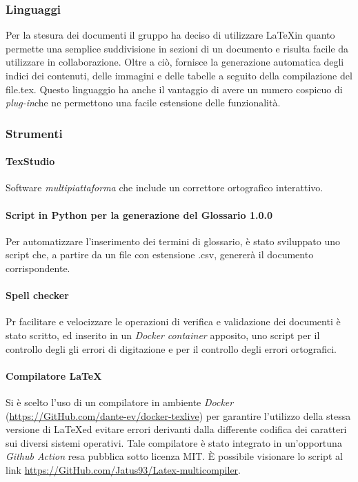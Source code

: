 \subsubsection{Linguaggi}
Per la stesura dei documenti il gruppo ha deciso di utilizzare \LaTeX \space in quanto permette una semplice suddivisione in sezioni di un documento e risulta facile da utilizzare in collaborazione. Oltre a ciò, fornisce la generazione automatica degli indici dei contenuti, delle immagini e delle tabelle a seguito della compilazione del file.tex. Questo linguaggio ha anche il vantaggio di avere un numero cospicuo di \textit{plug-in}\glo che ne permettono una facile estensione delle funzionalità.

\subsubsection{Strumenti}
\paragraph{TexStudio}
Software \textit{multipiattaforma\glo} che include un correttore ortografico interattivo.

\paragraph{Script in Python per la generazione del Glossario 1.0.0\docs}
Per automatizzare l'inserimento dei termini di glossario, è stato sviluppato uno script che, a partire da un file con estensione .csv, genererà il documento corrispondente.

\paragraph{Spell checker}
Pr facilitare e velocizzare le operazioni di verifica e validazione dei documenti è
stato scritto, ed inserito in un \textit{Docker\glo} \textit{container\glo} apposito, uno script per il controllo degli gli errori di digitazione e per il controllo degli errori ortografici.

\paragraph{Compilatore \LaTeX}
Si è scelto l'uso di un compilatore in ambiente\textit{ Docker\glo} (\url{https://GitHub.com/dante-ev/docker-texlive}) per garantire l'utilizzo della stessa versione di \LaTeX \space ed evitare errori derivanti dalla differente codifica dei caratteri sui diversi sistemi operativi. Tale compilatore è stato integrato in un'opportuna \textit{Github Action\glo} resa pubblica sotto licenza MIT. È possibile visionare lo script al link \url{https://GitHub.com/Jatus93/Latex-multicompiler}.


